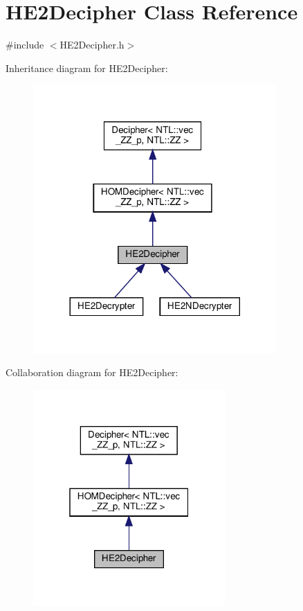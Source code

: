 \hypertarget{classHE2Decipher}{}\section{H\+E2\+Decipher Class Reference}
\label{classHE2Decipher}


{\ttfamily \#include $<$H\+E2\+Decipher.\+h$>$}



Inheritance diagram for H\+E2\+Decipher\+:\nopagebreak
\begin{figure}[H]
\begin{center}
\leavevmode
\includegraphics[width=264pt]{classHE2Decipher__inherit__graph}
\end{center}
\end{figure}


Collaboration diagram for H\+E2\+Decipher\+:\nopagebreak
\begin{figure}[H]
\begin{center}
\leavevmode
\includegraphics[width=208pt]{classHE2Decipher__coll__graph}
\end{center}
\end{figure}
